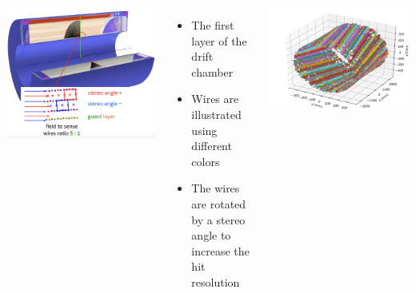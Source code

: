 \documentclass[final,xcolor={dvipsnames,svgnames,x11names,table}]{beamer}
\begin{document}
\begin{frame}
\begin{textblock}{82}
\begin{tcolorbox}[title=The drift chamber]
\begin{columns}
      \centering
      \includegraphics[width=\textwidth]{Figures/DriftChamber}

      \begin{itemize}
        \item The first layer of the drift chamber
        \item Wires are illustrated using different colors
        \item The wires are rotated by a stereo angle to increase the hit resolution
      \end{itemize}
      \centering
      \includegraphics[width=\textwidth]{Figures/allHits}


\end{columns}
\end{tcolorbox}
\end{textblock}
\end{frame}
\end{document}
